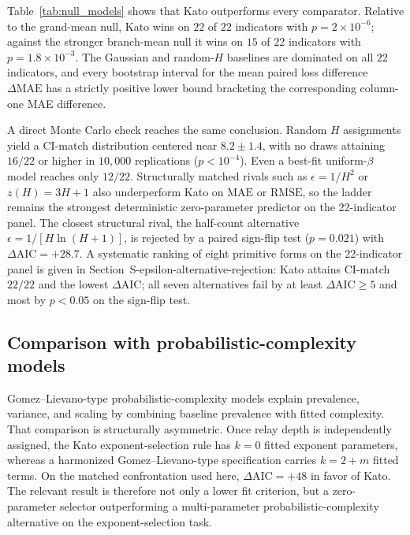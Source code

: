 Table~\ref{tab:null_models} shows that Kato outperforms every comparator.
Relative to the grand-mean null, Kato wins on $22$ of $22$ indicators with
$p=2\times10^{-6}$; against the stronger branch-mean null it wins on
$15$ of $22$ indicators with $p=1.8\times10^{-3}$. The Gaussian and
random-$H$ baselines are dominated on all $22$ indicators, and every
bootstrap interval for the mean paired loss difference \(\Delta\mathrm{MAE}\)
has a strictly positive lower bound bracketing the corresponding
column-one MAE difference.

A direct Monte Carlo check reaches the same conclusion. Random $H$
assignments yield a CI-match distribution centered near $8.2\pm1.4$, with no
draws attaining $16/22$ or higher in $10{,}000$ replications
($p<10^{-4}$). Even a best-fit uniform-$\beta$ model reaches only
$12/22$. Structurally matched rivals such as $\epsilon=1/H^2$ or
$z(H)=3H+1$ also underperform Kato on $\mathrm{MAE}$ or
$\mathrm{RMSE}$, so the ladder remains the strongest deterministic
zero-parameter predictor on the 22-indicator panel.
The closest structural rival, the half-count alternative
$\epsilon=1/[H\ln(H+1)]$, is rejected by a paired sign-flip test
($p=0.021$) with $\Delta\mathrm{AIC}=+28.7$.  A systematic ranking of
eight primitive forms on the 22-indicator panel is given in
Section~\textsf{S-epsilon-alternative-rejection}: Kato attains
$\mathrm{CI}$-match $22/22$ and the lowest $\Delta\mathrm{AIC}$;
all seven alternatives fail by at least $\Delta\mathrm{AIC}\ge 5$
and most by $p<0.05$ on the sign-flip test.

\subsection{Comparison with probabilistic-complexity models}
Gomez--Lievano-type probabilistic-complexity models explain prevalence,
variance, and scaling by combining baseline prevalence with fitted complexity.
That comparison is structurally asymmetric. Once relay depth is independently
assigned, the Kato exponent-selection rule has $k=0$ fitted exponent
parameters, whereas a harmonized Gomez--Lievano-type specification carries
$k=2+m$ fitted terms. On the matched confrontation used here,
$\Delta\mathrm{AIC}=+48$ in favor of Kato. The relevant result is therefore
not only a lower fit criterion, but a zero-parameter selector outperforming a
multi-parameter probabilistic-complexity alternative on the exponent-selection
task.

